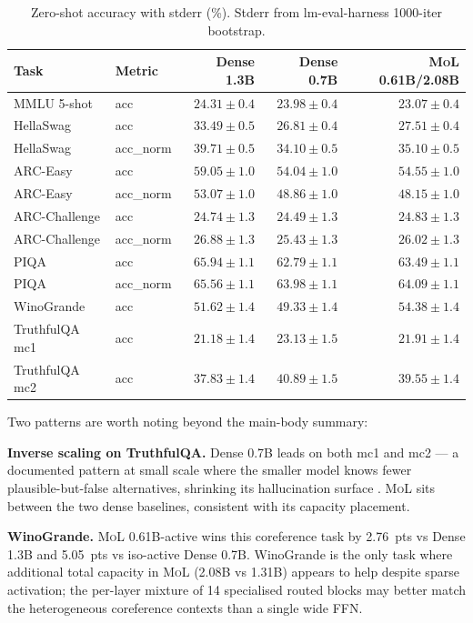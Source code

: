 \documentclass[10pt]{article}
\newcommand{\mol}{\textsc{MoL}}
\begin{document}
\begin{table}[h]
\centering\small
\caption{Zero-shot accuracy with stderr (\%). Stderr from lm-eval-harness 1000-iter bootstrap.}
\label{tab:1p3b_zeroshot_full}
\begin{tabular}{llrrr}
\toprule
Task & Metric & Dense 1.3B & Dense 0.7B & \mol{} 0.61B/2.08B \\
\midrule
MMLU 5-shot     & acc      & $24.31\pm0.4$ & $23.98\pm0.4$ & $23.07\pm0.4$ \\
HellaSwag       & acc      & $33.49\pm0.5$ & $26.81\pm0.4$ & $27.51\pm0.4$ \\
HellaSwag       & acc\_norm & $39.71\pm0.5$ & $34.10\pm0.5$ & $35.10\pm0.5$ \\
ARC-Easy        & acc      & $59.05\pm1.0$ & $54.04\pm1.0$ & $54.55\pm1.0$ \\
ARC-Easy        & acc\_norm & $53.07\pm1.0$ & $48.86\pm1.0$ & $48.15\pm1.0$ \\
ARC-Challenge   & acc      & $24.74\pm1.3$ & $24.49\pm1.3$ & $24.83\pm1.3$ \\
ARC-Challenge   & acc\_norm & $26.88\pm1.3$ & $25.43\pm1.3$ & $26.02\pm1.3$ \\
PIQA            & acc      & $65.94\pm1.1$ & $62.79\pm1.1$ & $63.49\pm1.1$ \\
PIQA            & acc\_norm & $65.56\pm1.1$ & $63.98\pm1.1$ & $64.09\pm1.1$ \\
WinoGrande      & acc      & $51.62\pm1.4$ & $49.33\pm1.4$ & $54.38\pm1.4$ \\
TruthfulQA mc1  & acc      & $21.18\pm1.4$ & $23.13\pm1.5$ & $21.91\pm1.4$ \\
TruthfulQA mc2  & acc      & $37.83\pm1.4$ & $40.89\pm1.5$ & $39.55\pm1.4$ \\
\bottomrule
\end{tabular}
\end{table}

Two patterns are worth noting beyond the main-body summary:

\textbf{Inverse scaling on TruthfulQA.} Dense 0.7B leads on both mc1 and mc2 — a documented pattern at small scale where the smaller model knows fewer plausible-but-false alternatives, shrinking its hallucination surface \citep{lin2022truthfulqa}. \mol{} sits between the two dense baselines, consistent with its capacity placement.

\textbf{WinoGrande.} \mol{} 0.61B-active wins this coreference task by 2.76~pts vs Dense 1.3B and 5.05~pts vs iso-active Dense 0.7B. WinoGrande is the only task where additional total capacity in \mol{} (2.08B vs 1.31B) appears to help despite sparse activation; the per-layer mixture of 14 specialised routed blocks may better match the heterogeneous coreference contexts than a single wide FFN.
\end{document}
